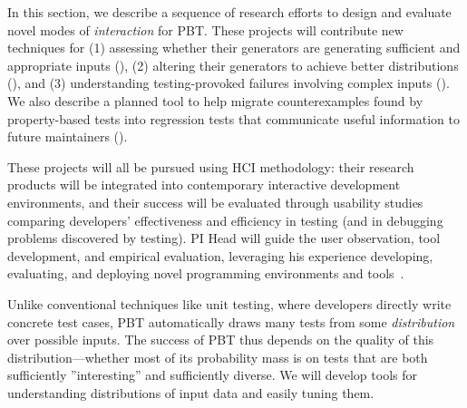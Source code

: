
In this section, we
describe a sequence of research efforts to design and evaluate novel modes of
{\em interaction} for PBT. These projects will contribute new
techniques for (1) assessing whether their generators are generating
sufficient and
appropriate inputs (), (2)
altering their generators to achieve better distributions
(),
and (3) understanding testing-provoked failures involving complex inputs
().
%
We also describe a planned tool to help migrate
counterexamples found by property-based tests into
regression tests that communicate useful information to future maintainers
().
%

These projects will all be pursued using HCI
methodology: their research products will be integrated into contemporary
interactive development environments, and their success will be
evaluated through usability studies
comparing developers' effectiveness and efficiency in testing (and in debugging
problems discovered by testing).  PI Head will guide the user observation,
tool development, and
empirical evaluation,
leveraging his
experience developing, evaluating, and deploying novel programming
environments and
tools~\cite{ref:head2015tutorons,ref:suzuki2017tracediff,ref:head2017writing,ref:head2018when,ref:head2018interactive,ref:head2019managing,ref:head2020composing}.

%
Unlike conventional techniques like unit testing, where developers
directly write concrete test cases,
PBT automatically draws many tests from some
{\em distribution} over possible inputs. The success of
PBT thus depends on the quality of this distribution---whether
most of its probability mass is on tests that are both sufficiently
''interesting'' and sufficiently diverse. We will develop
tools 
for
understanding distributions of input data and easily tuning them.

